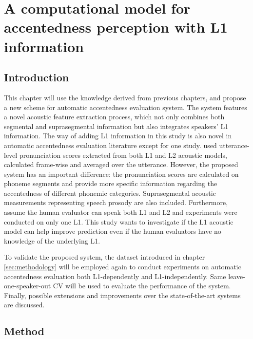 \chapter{A computational model for accentedness perception with L1 information}
\label{both_l1_l2}

\section{Introduction}

This chapter will use the knowledge derived from previous chapters, and propose a new scheme for automatic accentedness evaluation system. The system features a novel acoustic feature extraction process, which not only combines both segmental and suprasegmental information but also integrates speakers' L1 information. The way of adding L1 information in this study is also novel in automatic accentedness evaluation literature except for one study. \cite{moustroufas2007automatic} used utterance-level pronunciation scores extracted from both L1 and L2 acoustic models, calculated frame-wise and averaged over the utterance. However, the proposed system has an important difference: the pronunciation scores are calculated on phoneme segments and provide more specific information regarding the accentedness of different phonemic categories. Suprasegmental acoustic measurements representing speech prosody are also included. Furthermore, \cite{moustroufas2007automatic} assume the human evaluator can speak both L1 and L2 and experiments were conducted on only one L1. This study wants to investigate if the L1 acoustic model can help improve prediction even if the human evaluators have no knowledge of the underlying L1.

To validate the proposed system, the dataset introduced in chapter \ref{sec:methodology} will be employed again to conduct experiments on automatic accentedness evaluation both L1-dependently and L1-independently. Same leave-one-speaker-out CV will be used to evaluate the performance of the system. Finally, possible extensions and improvements over the state-of-the-art systems are discussed.

\section{Method}

